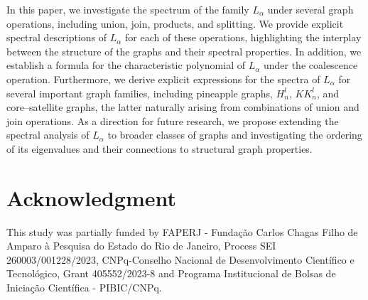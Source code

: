 \documentclass{article}
\begin{document}
In this paper, we investigate the spectrum of the family $L_\alpha$ under several graph operations, including union, join, products, and splitting. We provide explicit spectral descriptions of $L_\alpha$ for each of these operations, highlighting the interplay between the structure of the graphs and their spectral properties. In addition, we establish a formula for the characteristic polynomial of $L_\alpha$ under the coalescence operation. Furthermore, we derive explicit expressions for the spectra of $L_\alpha$ for several important graph families, including pineapple graphs, $H_n^l$, $KK_n^l$, and core--satellite graphs, the latter naturally arising from combinations of union and join operations. As a direction for future research, we propose extending the spectral analysis of $L_\alpha$ to broader classes of graphs and investigating the ordering of its eigenvalues and their connections to structural graph properties.

\section{Acknowledgment}

This study was partially funded by FAPERJ - Funda\-ção Carlos Chagas Filho de Amparo à Pesquisa do Estado do Rio de Janeiro, Process SEI 260003/001228/2023, CNPq-Conselho Nacional de Desenvolvimento Científico e Tecnológico, Grant 405552/2023-8 and Programa Institucional de Bolsas de Iniciação Científica - PIBIC/CNPq.


  
\end{document}
